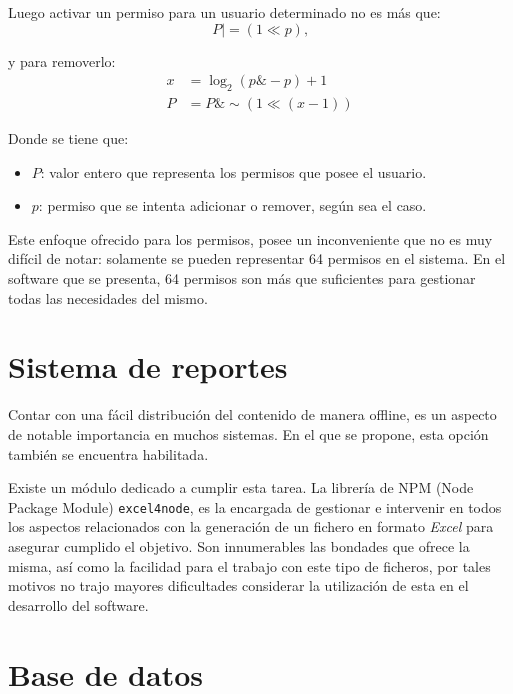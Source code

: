 \noindent Luego activar un permiso para un usuario determinado no es más que: \\
\begin{equation}
	P \mid= (1 \ll p) \text{,}
\end{equation}

\noindent y para removerlo:\\
\begin{equation}
	\begin{split}	
		x & = \log_{2}(p \& -p) + 1  \\
		P & = P \& \sim(1 \ll (x - 1))
	\end{split}
\end{equation}

\noindent Donde se tiene que: \\
\begin{itemize}
	\item $P$: valor entero que representa los permisos que posee el usuario.
	\item $p$: permiso que se intenta adicionar o remover, según sea el caso.
\end{itemize}

Este enfoque ofrecido para los permisos, posee un inconveniente que no es muy difícil de notar: solamente se pueden representar 64 permisos en el sistema. En el software que se presenta, 64 permisos son más que suficientes para  gestionar todas las necesidades del mismo.

\section{Sistema de reportes}

Contar con una fácil distribución del contenido de manera offline, es un aspecto de notable importancia en muchos sistemas. En el que se propone, esta opción también se encuentra habilitada. 

Existe un módulo dedicado a cumplir esta tarea. La librería de NPM (Node Package Module) \texttt{excel4node}\cite{excel4node_npm}, es la encargada de gestionar e intervenir en todos los aspectos relacionados con la generación de un fichero en formato \textit{Excel} para asegurar cumplido el objetivo. Son innumerables las bondades que ofrece la misma, así como la facilidad para el trabajo con este tipo de ficheros, por tales motivos no trajo mayores dificultades considerar la utilización de esta en el desarrollo del software.

\section{Base de datos}

